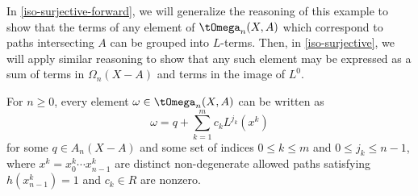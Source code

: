 In \cref{iso-surjective-forward}, we will generalize the reasoning of this example to show that the terms of any element of $\tOmega_n(X,A)$ which correspond to paths intersecting $A$ can be grouped into $L$-terms. Then, in \cref{iso-surjective}, we will apply similar reasoning to show that any such element may be expressed as a sum of terms in $\Omega_n(X-A)$ and terms in the image of $L^0$.

\begin{lemma}\label{iso-surjective-forward}
For $n \geq 0$, every element  $\omega \in \tOmega_n(X,A)$ can be written as 
\[
\omega = q + \sum_{k=1}^m c_k L^{j_k}(x^k) 
\]
for some $q \in A_n(X-A)$ and some set of indices $0 \leq k \leq m$ and $0 \leq j_k \leq n - 1$, where $x^k = x^k_0 \cdots x^k_{n-1}$ are distinct non-degenerate allowed paths satisfying $h(x^k_{n-1}) = 1$ and $c_k \in R$ are nonzero. 
\end{lemma}

